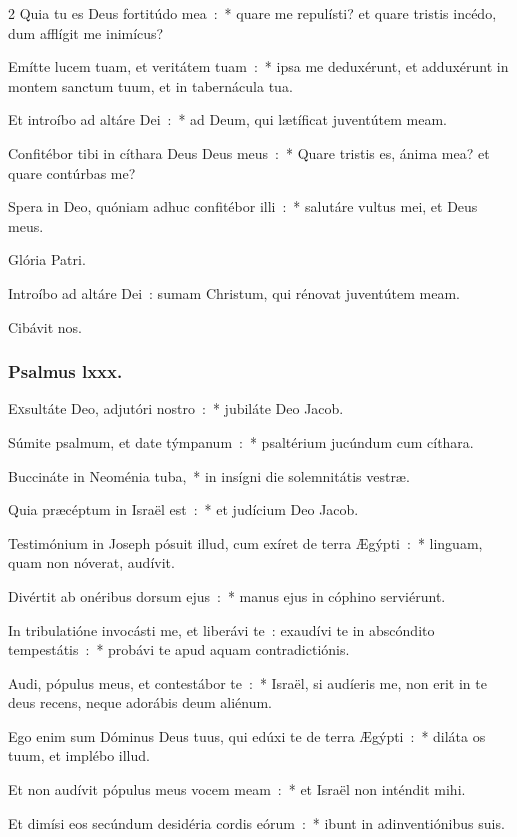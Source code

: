 \documentclass[9pt,twoside]{extarticle}
\begin{document}
\begin{multicols}{2}
Quia tu es Deus fortitúdo mea~:~* quare me repulísti? et quare tristis incédo, dum afflígit me inimícus?

Emítte lucem tuam, et veritátem tuam~:~* ipsa me deduxérunt, et adduxérunt in montem sanctum tuum, et in tabernácula tua.

Et introíbo ad altáre Dei~:~* ad Deum, qui lætíficat juventútem meam.

Confitébor tibi in cíthara Deus Deus meus~:~* Quare tristis es, ánima mea? et quare contúrbas me?

Spera in Deo, quóniam adhuc confitébor illi~:~* salutáre vultus mei, et Deus meus.

Glória Patri.

\begin{tightlist}{}
\item {} Introíbo ad altáre Dei~: sumam Christum, qui rénovat juventútem meam.
\item {} Cibávit nos.
\end{tightlist}

\subsubsection*{\center Psalmus lxxx.}
\lettrine{E}xsultáte Deo, adjutóri nostro~:~* jubiláte Deo Jacob.

Súmite psalmum, et date týmpanum~:~* psaltérium jucúndum cum cíthara.

Buccináte in Neoménia tuba,~* in insígni die solemnitátis vestræ.

Quia præcéptum in Israël est~:~* et judícium Deo Jacob.

Testimónium in Joseph pósuit illud, cum exíret de terra Ægýpti~:~* linguam, quam non nóverat, audívit.

Divértit ab onéribus dorsum ejus~:~* manus ejus in cóphino serviérunt.

In tribulatióne invocásti me, et liberávi te~: exaudívi te in abscóndito tempestátis~:~* probávi te apud aquam contradictiónis.

Audi, pópulus meus, et contestábor te~:~* Israël, si audíeris me, non erit in te deus recens, neque adorábis deum aliénum.

Ego enim sum Dóminus Deus tuus, qui edúxi te de terra Ægýpti~:~* diláta os tuum, et implébo illud.

Et non audívit pópulus meus vocem meam~:~* et Israël non inténdit mihi.

Et dimísi eos secúndum desidéria cordis eórum~:~* ibunt in adinventiónibus suis.


\end{multicols}
\end{document}
